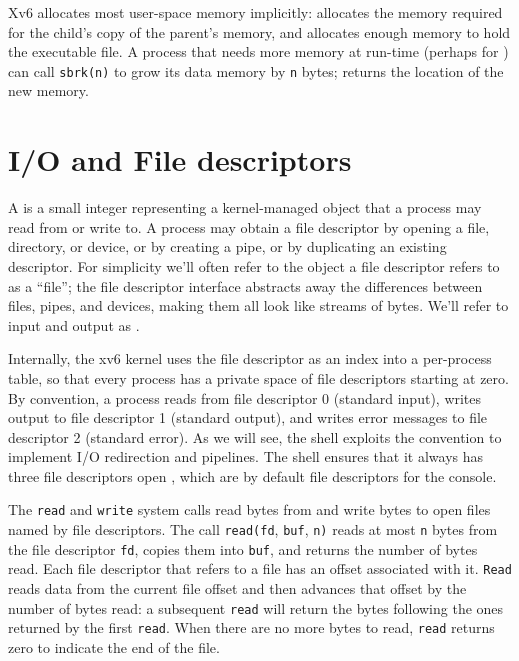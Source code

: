 Xv6 allocates most user-space memory
implicitly:
allocates the memory required for the child's copy of the
parent's memory, and 
allocates enough memory to hold the executable file.
A process that needs more memory at run-time (perhaps for
)
can call
\lstinline{sbrk(n)}
to grow its data memory by
\lstinline{n}
bytes;
returns the location of the new memory.

\section{I/O and File descriptors}

A 
is a small integer representing a kernel-managed object
that a process may read from or write to.
A process may obtain a file descriptor by opening a file, directory,
or device, or by creating a pipe, or by duplicating an existing
descriptor.
For simplicity we'll often refer to the object a file descriptor
refers to as a ``file'';
the file descriptor interface abstracts away the differences between
files, pipes, and devices, making them all look like streams of bytes.
We'll refer to input and output as .

Internally, the xv6 kernel uses the file descriptor
as an index into a per-process table,
so that every process has a private space of file descriptors
starting at zero.
By convention, a process reads from file descriptor 0 (standard input),
writes output to file descriptor 1 (standard output), and
writes error messages to file descriptor 2 (standard error).
As we will see, the shell exploits the convention to implement I/O redirection
and pipelines. The shell ensures that it always has three file descriptors
open
,
which are by default file descriptors for the console.

The
\lstinline{read}
and
\lstinline{write}
system calls read bytes from and write bytes to
open files named by file descriptors.
The call
\lstinline{read(fd},
\lstinline{buf},
\lstinline{n)}
reads at most
\lstinline{n}
bytes from the file descriptor
\lstinline{fd},
copies them into
\lstinline{buf},
and returns the number of bytes read.
Each file descriptor that refers to a file
has an offset associated with it.
\lstinline{Read}
reads data from the current file offset and then advances
that offset by the number of bytes read:
a subsequent
\lstinline{read}
will return the bytes following the ones returned by the first
\lstinline{read}.
When there are no more bytes to read,
\lstinline{read}
returns zero to indicate the end of the file.

